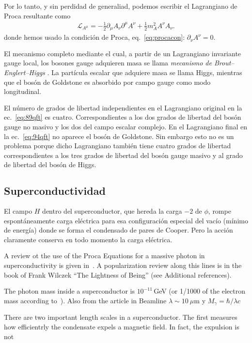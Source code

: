 \begin{frame}
Por lo tanto, y sin perdidad de generaliad, podemos escribir el Lagrangiano de Proca resultante como
\begin{align}
  \mathcal{L}_{A^\mu}=-\tfrac{1}{2}\partial_\mu A_\nu \partial^\mu A^\nu +\tfrac{1}{2}m_{A}^2 A^\nu A_\nu.
\end{align}
donde hemos usado la condición de Proca, eq.~\eqref{eq:procacon}: $\partial_\nu A^\nu=0$.

El mecanismo completo mediante el cual, a partir de un Lagrangiano invariante gauge local, los bosones gauge adquieren masa se llama \emph{mecanismo de Brout–Englert–Higgs} \cite{Englert:1964et,Higgs:1964pj}. La partícula escalar que adquiere masa se llama Higgs, mientras que el bosón de Goldstone es absorbido por campo gauge como modo longitudinal. 

El número de grados de libertad independientes en el Lagrangiano original en la ec.~\eqref{eq:89qft} es cuatro. Correspondientes a los dos grados de libertad del bosón gauge no masivo y los dos del campo escalar complejo. En el Lagrangiano final en la ec.~\eqref{eq:94qft} no aparece el bosón de Goldstone. Sin embargo esto no es un problema porque dicho Lagrangiano también tiene cuatro grados de libertad correspondientes a  los tres grados de libertad del bosón gauge masivo y al grado de libertad del bosón de Higgs. 
\end{frame}


\subsection{Superconductividad}

El campo $H$ dentro del superconductor, que hereda la carga $-2$ de
$\phi$, rompe espontáneamente carga eléctrica para esa configuración
especial del vacío (mínimo de energía) donde se forma el condensado de
pares de Cooper. Pero la acción claramente conserva en todo momento
la carga eléctrica.

A review ot the use of the Proca Equations for a massive photon in superconductivity is given in~\cite{massivephoton}. A popularization review along this lines is in the book of Frank Wilczek ``The Lightness of Being'' (see Additional references).

The photon mass inside a superconductor is $10^{-11}\,$GeV (or 1/1000 of the electron mass according to~\cite{massivephoton}). Also from the article in Beamline $\lambda\sim 10\ \mu\text{m}$ y $M_\gamma=\hbar/\lambda c$ %

There are two important length scales in a superconductor. The first measures how efficientrly the condensate expels a magnetic field. In fact, the expulsion is not 

